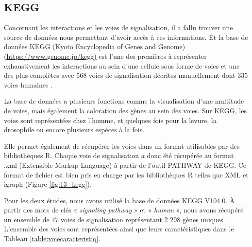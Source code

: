 \subsection{KEGG}\label{kegg}
\par Concernant les interactions et les voies de signalisation, il a fallu trouver une source de données nous permettant d’avoir accès à ces informations. Et la base de données KEGG (Kyoto Encyclopedia of Genes and Genome) \href{https://www.genome.jp/kegg}{(https://www.genome.jp/kegg)} est l’une des premières à représenter exhaustivement les interactions au sein d’une cellule sous forme de voies \parencite{bader_pathguide_2006} et une des plus complètes avec 568 voies de signalisation décrites manuellement dont 335 voies humaines \parencite{chanumolu_kegg2net_2021}.
\par La base de données a plusieurs fonctions comme la visualisation d’une multitude de voies, mais également la coloration des gènes au sein des voies. Sur KEGG, les voies sont représentées chez l’homme, et quelques fois pour la levure, la drosophile ou encore plusieurs espèces à la fois. 
\par Elle permet également de récupérer les voies dans un format utilisables par des bibliothèques R. Chaque voie de signalisation a donc été récupérée au format .xml (Extensible Markup Language) à partir de l'outil PATHWAY de KEGG. Ce format de fichier est bien pris en charge par les bibliothèques R telles que XML \parencite{lang_xml_2023} et igraph \parencite{csardi_igraph_2023, csardi_igraph_2006} (Figure \ref{fig:13_kegg}).
\par Pour les deux études, nous avons utilisé la base de données KEGG V104.0. À partir des mots de clés « \textit{signaling pathway} » et « \textit{human} », nous avons récupéré un ensemble de 47 voies de signalisation représentant 2 298 gènes uniques. L’ensemble des voies sont représentées ainsi que leurs caractéristiques dans le Tableau \ref{table:voiecaracteristiq}. 


